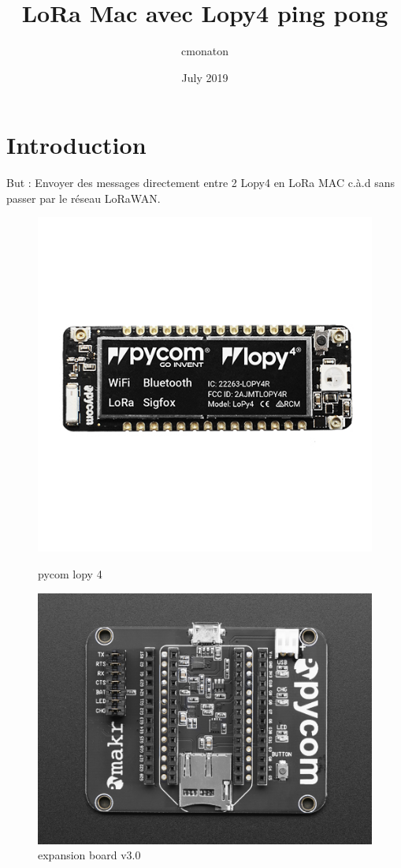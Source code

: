 \documentclass{article}
\title{LoRa Mac avec Lopy4 ping pong}
\author{cmonaton }
\date{July 2019}
\begin{document}
\maketitle

\section{Introduction}

But : Envoyer des messages directement entre 2 Lopy4 en LoRa MAC c.à.d sans passer par le réseau LoRaWAN.


  \begin{figure}[H]
  \centering
  \begin{minipage}[b]{0.4\textwidth}
    \includegraphics[keepaspectratio=true,scale=1.7]{pycom_lopy4.jpeg}
        \caption{pycom lopy 4}
  \end{minipage}
  \hfill
  \begin{minipage}[b]{0.4\textwidth}
   \includegraphics[keepaspectratio=true,scale=0.5]{pycom_expansion_board.jpeg}
    \caption{expansion board v3.0}
  \end{minipage}
\end{figure}
\end{document}
